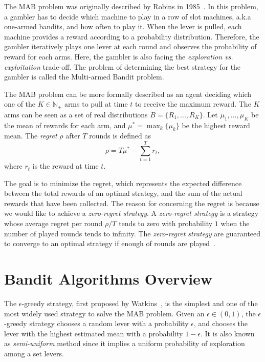 The MAB problem was originally described by Robins in 1985~\cite{Robbins:1985:MAB}.
In this problem, a gambler has to decide which machine to play in a row of slot machines, a.k.a one-armed bandits, and how often to play it.
When the lever is pulled, each machine provides a reward according to a probability distribution.
Therefore, the gambler iteratively plays one lever at each round and observes the probability of reward for each arms.
Here, the gambler is also facing the \textit{exploration vs. exploitation} trade-off.
The problem of determining the best strategy for the gambler is called the Multi-armed Bandit problem.


The MAB problem can be more formally described as 
an agent deciding which one of the $K \in \mathbb{N}_+$ arms to pull at time $t$ to receive the maximum reward.
The $K$ arms can be seen as a set of real distributions $B = \{ R_1, ..., R_K \} $.
Let $\mu_1, ..., \mu_K$ be the mean of rewards for each arm, and $\mu^* = \max_{k} \{ \mu_k \}$ be the highest reward mean.
The \textit{regret} $\rho$ after $T$ rounds is defined as
\begin{displaymath}
\rho = T\mu^* - \sum_{t=1}^{T} r_t,
\end{displaymath}
where $r_t$ is the reward at time $t$.

The goal is to minimize the regret, which represents the expected difference between the total rewards of an optimal strategy,
and the sum of the actual rewards that have been collected.  
The reason for concerning the regret is because we would like to achieve a \textit{zero-regret strategy}.
A \textit{zero-regret strategy} is a strategy whose average regret per round $\rho / T$ tends to zero with probability $1$ 
when the number of played rounds tends to infinity.
The \textit{zero-regret strategy} are guaranteed to converge to an optimal strategy if enough of rounds are played~\cite{Vermorel:2005:MAB}.



\section{Bandit Algorithms Overview}

The $\epsilon$-greedy strategy, first proposed by Watkins~\cite{Watkins:1989:eta}, 
is the simplest and one of the most widely used strategy to solve the MAB problem.
Given an $\epsilon \in (0,1)$,
the $\epsilon$-greedy strategy chooses a random lever with a probability $\epsilon$, 
and chooses the lever with the highest estimated mean with a probability $1 - \epsilon$.
It is also known as \textit{semi-uniform} method since it implies a uniform probability of exploration among a set levers.

